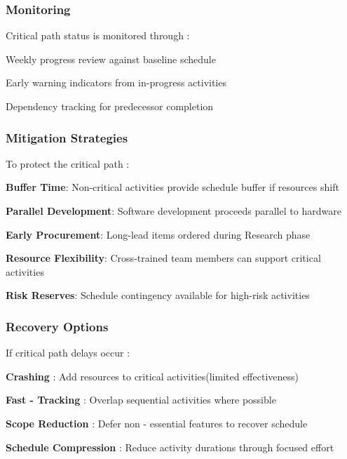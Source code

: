    \subsubsection{Monitoring}

    Critical path status is monitored through :

\begin {
      itemize
    }
    \item Weekly progress review against baseline schedule
    \item Early warning indicators from in-progress activities
    \item Dependency tracking for predecessor completion
\end{
      itemize
    }

    \subsubsection{Mitigation Strategies}

    To protect the critical path :

\begin {
      itemize
    }
    \item \textbf{Buffer Time}: Non-critical activities provide schedule buffer if resources shift
    \item \textbf{Parallel Development}: Software development proceeds parallel to hardware
    \item \textbf{Early Procurement}: Long-lead items ordered during Research phase
    \item \textbf{Resource Flexibility}: Cross-trained team members can support critical activities
    \item \textbf{Risk Reserves}: Schedule contingency available for high-risk activities
\end{
      itemize
    }

    \subsubsection{Recovery Options}

    If critical path delays occur :

\begin {
      enumerate
    }
    \item \textbf{Crashing} : Add resources to critical
                              activities(limited effectiveness)
    \item \textbf{Fast - Tracking}
        : Overlap sequential activities where possible
    \item \textbf{Scope Reduction} : Defer non
                                      -
                                      essential features to recover schedule
    \item \textbf{Schedule Compression}
        : Reduce activity durations through focused effort
\end {
      enumerate
    }

